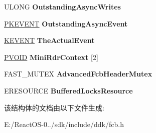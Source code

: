 \begin{DoxyCompactItemize}
U\+L\+O\+NG {\bfseries Outstanding\+Async\+Writes}
\item 
\mbox{\label{struct___n_o_n___p_a_g_e_d___f_c_b_a48df7087c2aba73bef33f4328c2cfc36}} 
\hyperlink{struct___k_e_v_e_n_t}{P\+K\+E\+V\+E\+NT} {\bfseries Outstanding\+Async\+Event}
\item 
\mbox{\label{struct___n_o_n___p_a_g_e_d___f_c_b_a042f03449515e64a5be91c7c33352833}} 
\hyperlink{struct___k_e_v_e_n_t}{K\+E\+V\+E\+NT} {\bfseries The\+Actual\+Event}
\item 
\mbox{\label{struct___n_o_n___p_a_g_e_d___f_c_b_a8ea68dfa3e07e439313b5f2c2320faf8}} 
\hyperlink{interfacevoid}{P\+V\+O\+ID} {\bfseries Mini\+Rdr\+Context} \mbox{[}2\mbox{]}
\item 
\mbox{\label{struct___n_o_n___p_a_g_e_d___f_c_b_a94449af6be4b017acecfaf2f30ba0803}} 
F\+A\+S\+T\+\_\+\+M\+U\+T\+EX {\bfseries Advanced\+Fcb\+Header\+Mutex}
\item 
\mbox{\label{struct___n_o_n___p_a_g_e_d___f_c_b_a1736d4e7758f33db7eba1de70fcadf13}} 
E\+R\+E\+S\+O\+U\+R\+CE {\bfseries Buffered\+Locks\+Resource}
\end{DoxyCompactItemize}


该结构体的文档由以下文件生成\+:\begin{DoxyCompactItemize}
\item 
E\+:/\+React\+O\+S-\/0../sdk/include/ddk/fcb.\+h\end{DoxyCompactItemize}
